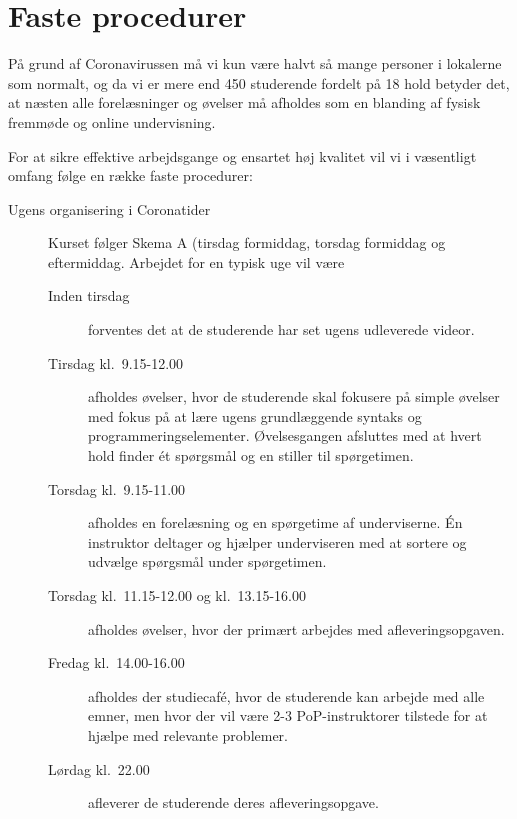 \documentclass[a4paper]{article}
\begin{document}
\section{Faste procedurer}
På grund af Coronavirussen må vi kun være halvt så mange personer i
lokalerne som normalt, og da vi er mere end 450 studerende fordelt på 18
hold betyder det, at næsten alle forelæsninger og øvelser må afholdes
som en blanding af fysisk fremmøde og online undervisning.

For at sikre effektive arbejdsgange og ensartet høj kvalitet vil vi i væsentligt omfang følge en række faste procedurer:
\begin{description}
\item[Ugens organisering i Coronatider] Kurset følger Skema A (tirsdag
  formiddag, torsdag formiddag og eftermiddag. Arbejdet for en typisk
  uge vil være
  \begin{description}
  \item[Inden tirsdag] forventes det at de studerende har set ugens
    udleverede videor.
  \item[Tirsdag kl.\ 9.15-12.00] afholdes øvelser, hvor de studerende
    skal fokusere på simple øvelser med fokus på at lære ugens
    grundlæggende syntaks og programmeringselementer. Øvelsesgangen
    afsluttes med at hvert hold finder {\'e}t spørgsmål og en stiller
    til spørgetimen.
  \item[Torsdag kl.\ 9.15-11.00] afholdes en forelæsning og en
    spørgetime af underviserne. {\'E}n instruktor deltager og hjælper
    underviseren med at sortere og udvælge spørgsmål under
    spørgetimen.
  \item[Torsdag kl.\ 11.15-12.00 og kl.\ 13.15-16.00] afholdes
    øvelser, hvor der primært arbejdes med afleveringsopgaven.
  \item[Fredag kl.\ 14.00-16.00] afholdes der studiecaf{\'e}, hvor de
    studerende kan arbejde med alle emner, men hvor der vil være 2-3
    PoP-instruktorer tilstede for at hjælpe med relevante problemer.
  \item[Lørdag kl.\ 22.00] afleverer de studerende deres afleveringsopgave.
  \end{description}


\end{description}
\end{document}
